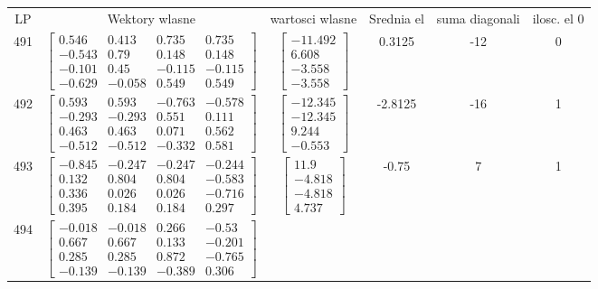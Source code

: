 \documentclass[a4paper,12pt]{article}
\begin{document}
\bgroup {} \vspace{0.2in} \begin{tabular}{c c c c c c}
LP &Wektory wlasne & wartosci wlasne & Srednia el & suma diagonali & ilosc. el 0\\
491
&
$\begin{bmatrix} 0.546 & 0.413 & 0.735 & 0.735 \\ -0.543 & 0.79 & 0.148 & 0.148 \\ -0.101 & 0.45 & -0.115 & -0.115 \\ -0.629 & -0.058 & 0.549 & 0.549 \end{bmatrix}$
&
$\begin{bmatrix} -11.492 \\ 6.608 \\ -3.558 \\ -3.558 \end{bmatrix}$
&
0.3125
&
-12
&
0
\\
492
&
$\begin{bmatrix} 0.593 & 0.593 & -0.763 & -0.578 \\ -0.293 & -0.293 & 0.551 & 0.111 \\ 0.463 & 0.463 & 0.071 & 0.562 \\ -0.512 & -0.512 & -0.332 & 0.581 \end{bmatrix}$
&
$\begin{bmatrix} -12.345 \\ -12.345 \\ 9.244 \\ -0.553 \end{bmatrix}$
&
-2.8125
&
-16
&
1
\\
493
&
$\begin{bmatrix} -0.845 & -0.247 & -0.247 & -0.244 \\ 0.132 & 0.804 & 0.804 & -0.583 \\ 0.336 & 0.026 & 0.026 & -0.716 \\ 0.395 & 0.184 & 0.184 & 0.297 \end{bmatrix}$
&
$\begin{bmatrix} 11.9 \\ -4.818 \\ -4.818 \\ 4.737 \end{bmatrix}$
&
-0.75
&
7
&
1
\\
494
&
$\begin{bmatrix} -0.018 & -0.018 & 0.266 & -0.53 \\ 0.667 & 0.667 & 0.133 & -0.201 \\ 0.285 & 0.285 & 0.872 & -0.765 \\ -0.139 & -0.139 & -0.389 & 0.306 \end{bmatrix}$

\end{tabular}
\end{document}
